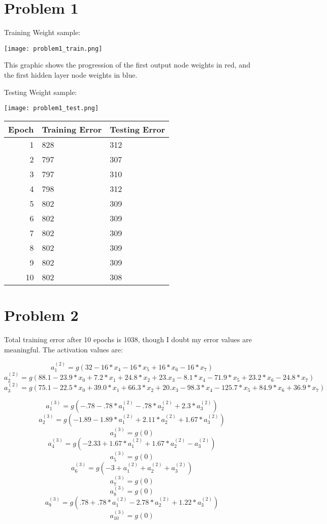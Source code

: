 \documentclass{article}
\begin{document}
\section*{Problem 1}

\nblock
Training Weight sample:
\nbstop

\begin{center}
\texttt{[image: problem1\_train.png]}
\end{center}

\nblock
This graphic shows the progression of the first output node weights in red,
and the first hidden layer node weights in blue.

Testing Weight sample:
\nbstop

\begin{center}
\texttt{[image: problem1\_test.png]}

\begin{tabular}{r l l}
Epoch & Training Error & Testing Error \\ 
\hline
1 & 828 & 312 \\
2 & 797 & 307 \\
3 & 797 & 310 \\
4 & 798 & 312 \\
5 & 802 & 309 \\
6 & 802 & 309 \\
7 & 802 & 309 \\
8 & 802 & 309 \\
9 & 802 & 309 \\
10 & 802 & 308
\end{tabular}
\end{center}

\section*{Problem 2}
\nblock
Total training error after 10 epochs is 1038, though I doubt my error values are meaningful.
The activation values are:

\[a_1^{(2)} = g(32 - 16*x_4 - 16*x_5 + 16*x_6 - 16*x_7) \]
\[a_2^{(2)} = g(88.1 - 23.9*x_0 + 7.2*x_1 + 24.8*x_2 + 23.x_3 - 8.1*x_4 - 71.9*x_5 + 23.2*x_6 - 24.8*x_7) \]
\[a_3^{(2)} = g(75.1 - 22.5*x_0 + 39.0*x_1 + 66.3*x_2 + 20.x_3 - 98.3*x_4 - 125.7*x_5 + 84.9*x_6 + 36.9*x_7) \]


\[a_1^{(3)} = g(-.78 - .78*a_1^{(2)} - .78*a_2^{(2)} + 2.3*a_3^{(2)}) \]
\[a_2^{(3)} = g(-1.89 - 1.89*a_1^{(2)} + 2.11*a_2^{(2)} + 1.67*a_3^{(2)}) \]
\[a_3^{(3)} = g(0) \]
\[a_4^{(3)} = g(-2.33 + 1.67*a_1^{(2)} + 1.67*a_2^{(2)} - a_3^{(2)}) \]
\[a_5^{(3)} = g(0) \]
\[a_6^{(3)} = g(-3 + a_1^{(2)} + a_2^{(2)} + a_3^{(2)}) \]
\[a_7^{(3)} = g(0) \]
\[a_8^{(3)} = g(0) \]
\[a_9^{(3)} = g(.78 + .78*a_1^{(2)} - 2.78*a_2^{(2)} + 1.22*a_3^{(2)}) \]
\[a_{10}^{(3)} = g(0) \]
\end{document}
